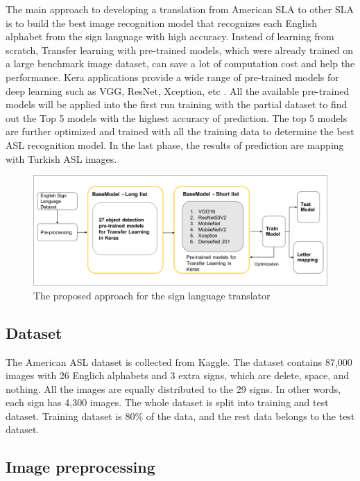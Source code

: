 The main approach to developing a translation from American SLA to other SLA is to build the best image recognition model that recognizes each English alphabet from the sign language with high accuracy. Instead of learning from scratch, Transfer learning with pre-trained models, which were already trained on a large benchmark image dataset, can save a lot of computation cost and help the performance. Kera applications provide a wide range of pre-trained models for deep learning such as VGG, ResNet, Xception, etc \cite{keras}. All the available pre-trained models will be applied into the first run training with the partial dataset to find out the Top 5 models with the highest accuracy of prediction. The top 5 models are further optimized and trained with all the training data to determine the best ASL recognition model. In the last phase, the results of prediction are mapping with Turkish ASL images.

\begin{figure}[h]
    \centering
    \caption{The proposed approach for the sign language translator}
	\label{fig:the proposed approach}
    \includegraphics[width=\linewidth]{figures/The approach}
\end{figure}


\subsection{Dataset}
The American ASL dataset is collected from Kaggle. The dataset contains 87,000 images with 26 Englich alphabets and 3 extra signs, which are delete, space, and nothing. All the images are equally distributed to the 29 signs. In other words, each sign has 4,300 images. The whole dataset is split into training and test dataset. Training dataset is 80\% of the data, and the rest data belongs to the test dataset. 


\subsection{Image preprocessing}

